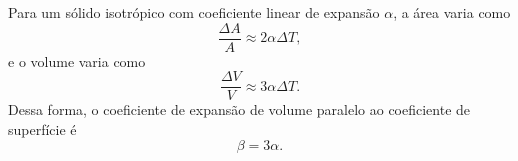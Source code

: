 Para um sólido isotrópico com coeficiente linear de expansão $\alpha$, a área varia como
\[
\frac{\Delta A}{A} \approx 2\alpha\Delta T,
\]
e o volume varia como
\[
\frac{\Delta V}{V} \approx 3\alpha\Delta T.
\]
Dessa forma, o coeficiente de expansão de volume paralelo ao coeficiente de superfície é
\[
\beta = 3\alpha.
\]